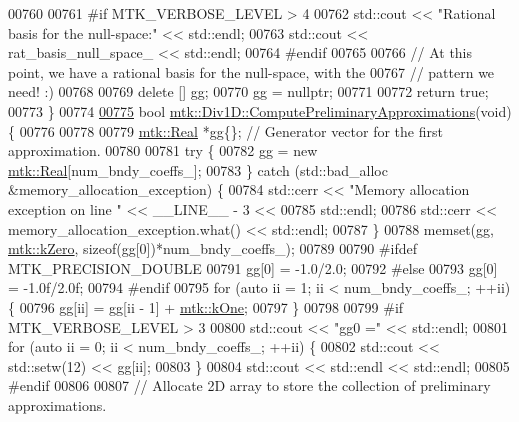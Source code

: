 \begin{DoxyCode}
{{00760 
00761 \textcolor{preprocessor}{  #if MTK\_VERBOSE\_LEVEL > 4}
00762   std::cout << \textcolor{stringliteral}{"Rational basis for the null-space:"} << std::endl;
00763   std::cout << rat\_basis\_null\_space\_ << std::endl;
00764 \textcolor{preprocessor}{  #endif}
00765 
00766   \textcolor{comment}{// At this point, we have a rational basis for the null-space, with the}
00767   \textcolor{comment}{// pattern we need! :)}
00768 
00769   \textcolor{keyword}{delete} [] gg;
00770   gg = \textcolor{keyword}{nullptr};
00771 
00772   \textcolor{keywordflow}{return} \textcolor{keyword}{true};
00773 \}
00774 
\hypertarget{mtk__div__1d_8cc_source_l00775}{}\hyperlink{classmtk_1_1Div1D_a4be0534a4e22d44a7aedde326cc3f3b6}{00775} \textcolor{keywordtype}{bool} \hyperlink{classmtk_1_1Div1D_a4be0534a4e22d44a7aedde326cc3f3b6}{mtk::Div1D::ComputePreliminaryApproximations}(\textcolor{keywordtype}{void}) \{
00776 
00778 
00779   \hyperlink{group__c01-roots_gac080bbbf5cbb5502c9f00405f894857d}{mtk::Real} *gg\{\}; \textcolor{comment}{// Generator vector for the first approximation.}
00780 
00781   \textcolor{keywordflow}{try} \{
00782     gg = \textcolor{keyword}{new} \hyperlink{group__c01-roots_gac080bbbf5cbb5502c9f00405f894857d}{mtk::Real}[num\_bndy\_coeffs\_];
00783   \} \textcolor{keywordflow}{catch} (std::bad\_alloc &memory\_allocation\_exception) \{
00784     std::cerr << \textcolor{stringliteral}{"Memory allocation exception on line "} << \_\_LINE\_\_ - 3 <<
00785 std::endl;
00786     std::cerr << memory\_allocation\_exception.what() << std::endl;
00787   \}
00788   memset(gg, \hyperlink{group__c01-roots_ga59a451a5fae30d59649bcda274fea271}{mtk::kZero}, \textcolor{keyword}{sizeof}(gg[0])*num\_bndy\_coeffs\_);
00789 
00790 \textcolor{preprocessor}{  #ifdef MTK\_PRECISION\_DOUBLE}
00791   gg[0] = -1.0/2.0;
00792 \textcolor{preprocessor}{  #else}
00793   gg[0] = -1.0f/2.0f;
00794 \textcolor{preprocessor}{  #endif}
00795   \textcolor{keywordflow}{for} (\textcolor{keyword}{auto} ii = 1; ii < num\_bndy\_coeffs\_; ++ii) \{
00796     gg[ii] = gg[ii - 1] + \hyperlink{group__c01-roots_ga26407c24d43b6b95480943340d285c71}{mtk::kOne};
00797   \}
00798 
00799 \textcolor{preprocessor}{  #if MTK\_VERBOSE\_LEVEL > 3}
00800   std::cout << \textcolor{stringliteral}{"gg0 ="} << std::endl;
00801   \textcolor{keywordflow}{for} (\textcolor{keyword}{auto} ii = 0; ii < num\_bndy\_coeffs\_; ++ii) \{
00802     std::cout << std::setw(12) << gg[ii];
00803   \}
00804   std::cout << std::endl << std::endl;
00805 \textcolor{preprocessor}{  #endif}
00806 
00807   \textcolor{comment}{// Allocate 2D array to store the collection of preliminary approximations.}
}}
\end{DoxyCode}
